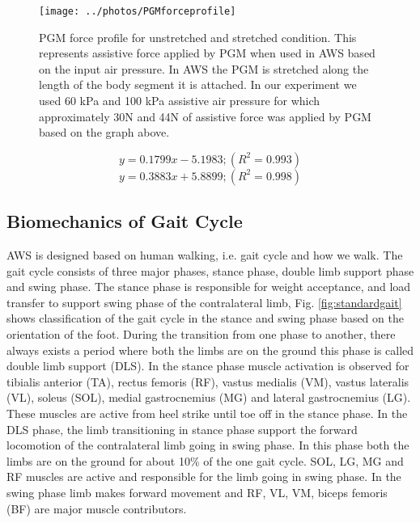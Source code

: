 \documentclass[letterpaper, 10 pt, conference]{ieeeconf}  %
\begin{document}
\begin{figure}
	\centering
	\texttt{[image: ../photos/PGMforceprofile]}
	\caption{PGM force profile for unstretched and stretched condition. This represents assistive force applied by PGM when used in AWS based on the input air pressure. In AWS the PGM is stretched along the length of the body segment it is attached. In our experiment we used 60 kPa and 100 kPa assistive air pressure for which approximately 30N and 44N of assistive force was applied by PGM based on the graph above.}
	\label{fig:pgmforceprofile}
\end{figure}


\begin{equation}\label{pgmunstreched}
y=0.1799x - 5.1983; (R^2=0.993)
\end{equation}
\begin{equation}\label{pgmstreched}
y = 0.3883x + 5.8899; (R^2=0.998)
\end{equation}

\subsection{Biomechanics of Gait Cycle } \label{method:gaitcycle}
AWS is designed based on human walking, i.e. gait cycle and how we walk. The gait cycle consists of three major phases, stance phase, double limb support phase and swing phase. The stance phase is responsible for weight acceptance, and load transfer to support swing phase of the contralateral limb, Fig. \ref{fig:standardgait} shows classification of the gait cycle in the stance and swing phase based on the orientation of the foot. During the transition from one phase to another, there always exists a period where both the limbs are on the ground this phase is called double limb support (DLS). In the stance phase muscle activation is observed for tibialis anterior (TA), rectus femoris (RF), vastus medialis (VM), vastus lateralis (VL), soleus (SOL), medial gastrocnemius (MG) and lateral gastrocnemius (LG). These muscles are active from heel strike until toe off in the stance phase. In the DLS phase, the limb transitioning in stance phase support the forward locomotion of the contralateral limb going in swing phase. In this phase both the limbs are on the ground for about 10\% of the one gait cycle. SOL, LG, MG and RF muscles are active and responsible for the limb going in swing phase. In the swing phase limb makes forward movement and RF, VL, VM, biceps femoris (BF) are major muscle contributors. 
\end{document}
